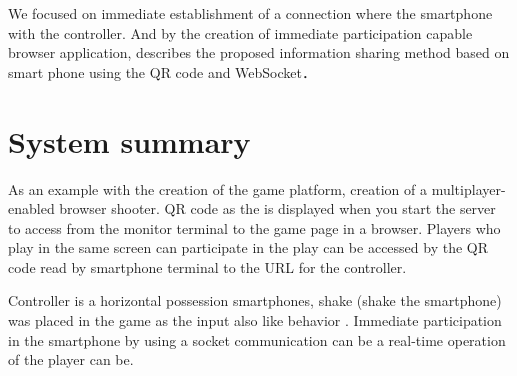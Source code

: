 We focused on immediate establishment of a connection where the smartphone with the controller. And by the creation of immediate participation capable browser application, describes the proposed information sharing method based on smart phone using the QR code and WebSocket\cite{ec2015}．


\section{System summary}

As an example with the creation of the game platform, creation of a multiplayer-enabled browser shooter. QR code  as the is displayed when you start the server to access from the monitor terminal to the game page in a browser. Players who play in the same screen can participate in the play can be accessed by the QR code read by smartphone terminal to the URL for the controller.

Controller is a horizontal possession smartphones, shake (shake the smartphone) was placed in the game as the input also like behavior . Immediate participation in the smartphone by using a socket communication \cite{webpagesocketio} can be a real-time operation of the player can be.


